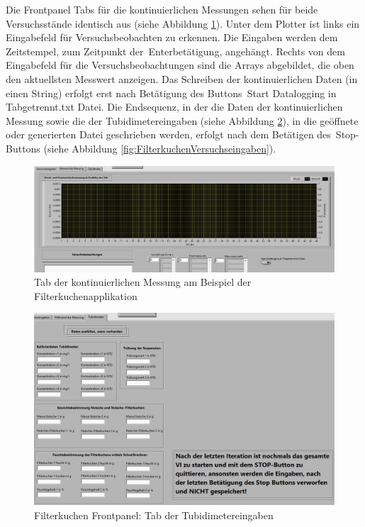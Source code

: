 Die Frontpanel Tabs für die kontinuierlichen Messungen sehen für beide Versuchsstände identisch aus (siehe Abbildung  \ref{fig:messung}). Unter dem Plotter ist links ein Eingabefeld für Versuchsbeobachten zu erkennen. Die Eingaben werden dem Zeitstempel, zum Zeitpunkt der \,{\Menlo Enter}betätigung, angehängt. Rechts von dem Eingabefeld für die Versuchsbeobachtungen sind die Arrays abgebildet, die oben den aktuellsten Messwert anzeigen. Das Schreiben der kontinuierlichen Daten (in einen String) erfolgt erst nach Betätigung des Buttons \,{\Menlo Start Datalogging in Tabgetrennt.txt Datei}. Die Endsequenz, in der die Daten der kontinuierlichen Messung sowie die der Tubidimetereingaben (siehe Abbildung \ref{fig:tubidimetereingaben}), in die geöffnete oder generierten Datei geschrieben werden, erfolgt nach dem Betätigen des \,{\Menlo Stop}-Buttons (siehe Abbildung \ref{fig:FilterkuchenVersuchseingaben}). 

\begin{figure}[h!] %
\centering
\includegraphics[width=1\textwidth]{Bilder/Filterkuchen_Appfotos/Filterkuchen_diagramm.jpg}
\vspace{0em}
 \caption[Filterkuchen Frontpanel: Tab der kontinuierlichen Messung am Beispiel der Filterkuchenapplikation]
{Tab der kontinuierlichen Messung am Beispiel der Filterkuchenapplikation}\label{fig:messung}
\end{figure}

\begin{figure}[h!] %
\centering
\includegraphics[width=1.07\textwidth]{Bilder/Filterkuchen_Appfotos/Tubidimeter_FP_Eingaben.jpg}
\vspace{0em}
 \caption[Filterkuchen Frontpanel: Tab der Tubidimetereingaben]
{Filterkuchen Frontpanel: Tab der Tubidimetereingaben}\label{fig:tubidimetereingaben}
\end{figure}



